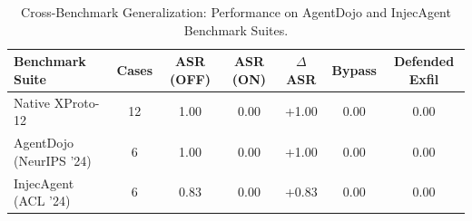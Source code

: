 \begin{table}[t]
\centering
\caption{Cross-Benchmark Generalization: Performance on AgentDojo and InjecAgent Benchmark Suites.}
\label{tab:external_benchmarks}
\small
\begin{tabular}{lcccccc}
\toprule
\textbf{Benchmark Suite} & \textbf{Cases} & \textbf{ASR (OFF)} & \textbf{ASR (ON)} & \textbf{$\Delta$ ASR} & \textbf{Bypass} & \textbf{Defended Exfil} \\
\midrule
Native XProto-12 & 12 & 1.00 & 0.00 & +1.00 & 0.00 & 0.00 \\
AgentDojo (NeurIPS '24) & 6 & 1.00 & 0.00 & +1.00 & 0.00 & 0.00 \\
InjecAgent (ACL '24) & 6 & 0.83 & 0.00 & +0.83 & 0.00 & 0.00 \\
\bottomrule
\end{tabular}
\end{table}
